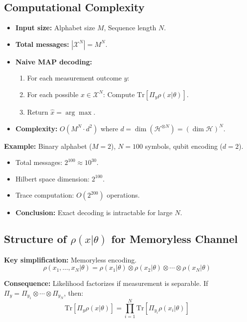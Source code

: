 \documentclass[11pt,a4paper]{article}
\begin{document}
\subsection{Computational Complexity}

\begin{itemize}
    \item \textbf{Input size:} Alphabet size $M$, Sequence length $N$.
    \item \textbf{Total messages:} $|\mathcal{X}^N| = M^N$.
    \item \textbf{Naive MAP decoding:}
    \begin{enumerate}
        \item For each measurement outcome $y$:
        \item For each possible $x \in \mathcal{X}^N$: Compute $\text{Tr}[\Pi_y\rho(x|\theta)]$.
        \item Return $\hat{x} = \arg\max$.
    \end{enumerate}
    \item \textbf{Complexity:} $O(M^N \cdot d^2)$ where $d = \dim(\mathcal{H}^{\otimes N}) = (\dim \mathcal{H})^N$.
\end{itemize}

\textbf{Example:} Binary alphabet ($M = 2$), $N = 100$ symbols, qubit encoding ($d = 2$).
\begin{itemize}
    \item Total messages: $2^{100} \approx 10^{30}$.
    \item Hilbert space dimension: $2^{100}$.
    \item Trace computation: $O(2^{200})$ operations.
    \item \textbf{Conclusion:} Exact decoding is intractable for large $N$.
\end{itemize}

\subsection{Structure of $\rho(x|\theta)$ for Memoryless Channel}

\textbf{Key simplification:} Memoryless encoding.
\begin{equation}
\rho(x_1, \ldots, x_N|\theta) = \rho(x_1|\theta) \otimes \rho(x_2|\theta) \otimes \cdots \otimes \rho(x_N|\theta)
\end{equation}

\textbf{Consequence:} Likelihood factorizes if measurement is separable. If $\Pi_y = \Pi_{y_1} \otimes \cdots \otimes \Pi_{y_N}$, then:
\begin{equation}
\text{Tr}[\Pi_y\rho(x|\theta)] = \prod_{i=1}^N \text{Tr}[\Pi_{y_i}\rho(x_i|\theta)]
\end{equation}
\end{document}
